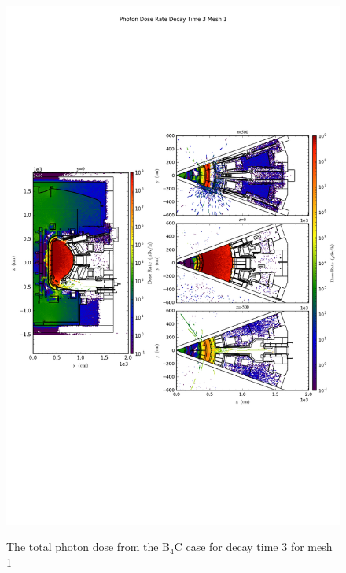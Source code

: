 \begin{figure}[ht!]
\centering
\includegraphics[trim={0cm 9cm 0cm 10cm},clip,scale=0.75]{../plots/final_model_nob4c/Photon_Dose_Rate_Decay_Time_3_Mesh_1.png}
\label{fig:photons_dc3_no4bc_m1_flux}
\caption{The total photon dose from the B$_4$C case for decay time 3 for mesh 1}
\end{figure}
